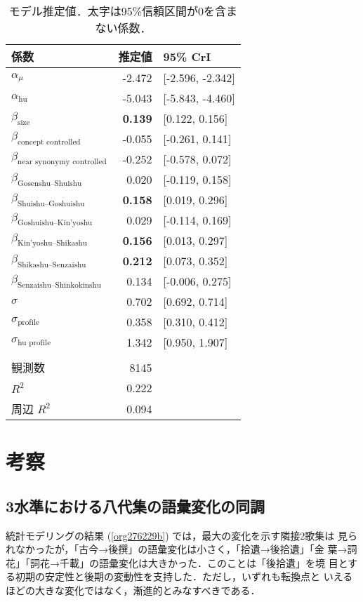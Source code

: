 \documentclass[submit]{ipsj}
\renewcommand{\ref}{\cref}
\begin{document}
\begin{table}[tb]
\caption{\label{tab:orgdc80bca}モデル推定値．太字は95\%信頼区間が0を含まない係数．}
\centering
\begin{tabular}{lrl}
係数 & 推定値 & 95\% CrI\\
\hline
\(\alpha_{\mu}\) & -2.472 & {[}-2.596, -2.342]\\
\(\alpha_{\text{hu}}\) & -5.043 & {[}-5.843, -4.460]\\
\(\beta_{\text{size}}\) & \textbf{0.139} & {[}0.122, 0.156]\\
\(\beta_{\text{concept controlled}}\) & -0.055 & {[}-0.261, 0.141]\\
\(\beta_{\text{near synonymy controlled}}\) & -0.252 & {[}-0.578, 0.072]\\
\(\beta_{\text{Gosenshu--Shuishu}}\) & 0.020 & {[}-0.119, 0.158]\\
\(\beta_{\text{Shuishu--Goshuishu}}\) & \textbf{0.158} & {[}0.019, 0.296]\\
\(\beta_{\text{Goshuishu--Kin'yoshu}}\) & 0.029 & {[}-0.114, 0.169]\\
\(\beta_{\text{Kin'yoshu--Shikashu}}\) & \textbf{0.156} & {[}0.013, 0.297]\\
\(\beta_{\text{Shikashu--Senzaishu}}\) & \textbf{0.212} & {[}0.073, 0.352]\\
\(\beta_{\text{Senzaishu--Shinkokinshu}}\) & 0.134 & {[}-0.006, 0.275]\\
\(\sigma\) & 0.702 & {[}0.692, 0.714]\\
\(\sigma_{\text{profile}}\) & 0.358 & {[}0.310, 0.412]\\
\(\sigma_{\text{hu profile}}\) & 1.342 & {[}0.950, 1.907]\\
 &  & \\
観測数 & 8145 & \\
\(R^2\) & 0.222 & \\
周辺 \(R^2\) & 0.094 & \\
\end{tabular}
\end{table}
\section{考察\label{orgba685f7}}
\label{sec:orgbba58f0}
\subsection{3水準における八代集の語彙変化の同調\label{orgf1bd750}}
\label{sec:org5403e2d}
統計モデリングの結果 (\ref{org276229b}) では，最大の変化を示す隣接2歌集は
見られなかったが，「古今→後撰」の語彙変化は小さく，「拾遺→後拾遺」「金
葉→詞花」「詞花→千載」の語彙変化は大きかった．このことは「後拾遺」を境
目とする初期の安定性と後期の変動性を支持した．ただし，いずれも転換点と
いえるほどの大きな変化ではなく，漸進的とみなすべきである．
\end{document}
